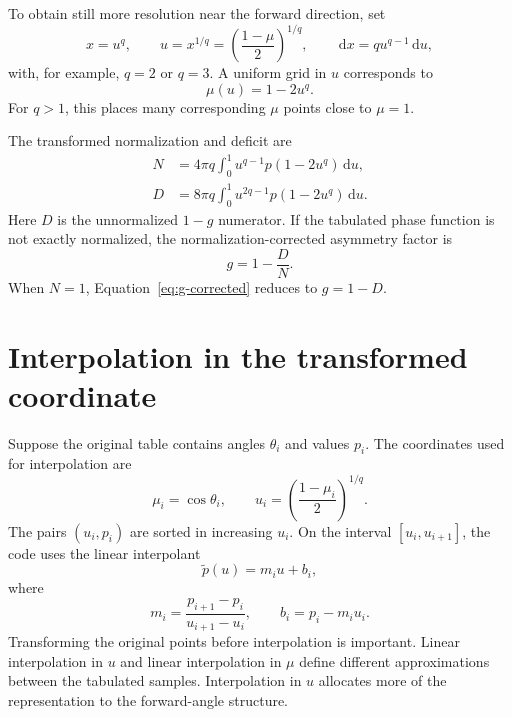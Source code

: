 \documentclass[11pt]{article}
\newcommand{\dd}{\,\mathrm{d}}
\begin{document}
To obtain still more resolution near the forward direction, set
\begin{equation}
    x=u^q,
    \qquad
    u=x^{1/q}
      =\left(\frac{1-\mu}{2}\right)^{1/q},
    \qquad
    \dd x=q u^{q-1}\dd u,
    \label{eq:u-transform}
\end{equation}
with, for example, $q=2$ or $q=3$.  A uniform grid in $u$ corresponds to
\begin{equation}
    \mu(u)=1-2u^q.
\end{equation}
For $q>1$, this places many corresponding $\mu$ points close to $\mu=1$.

The transformed normalization and deficit are
\begin{align}
    N
    &=4\pi q\int_0^1
      u^{q-1}p(1-2u^q)\dd u,
      \label{eq:N}\\
    D
    &=8\pi q\int_0^1
      u^{2q-1}p(1-2u^q)\dd u.
      \label{eq:D}
\end{align}
Here $D$ is the unnormalized $1-g$ numerator.  If the tabulated phase function
is not exactly normalized, the normalization-corrected asymmetry factor is
\begin{equation}
    \boxed{g=1-\frac{D}{N}}.
    \label{eq:g-corrected}
\end{equation}
When $N=1$, Equation~\eqref{eq:g-corrected} reduces to $g=1-D$.

\section{Interpolation in the transformed coordinate}

Suppose the original table contains angles $\theta_i$ and values $p_i$.  The
coordinates used for interpolation are
\begin{equation}
    \mu_i=\cos\theta_i,
    \qquad
    u_i=\left(\frac{1-\mu_i}{2}\right)^{1/q}.
\end{equation}
The pairs $(u_i,p_i)$ are sorted in increasing $u_i$.  On the interval
$[u_i,u_{i+1}]$, the code uses the linear interpolant
\begin{equation}
    \widetilde p(u)=m_i u+b_i,
    \label{eq:linear-interpolant}
\end{equation}
where
\begin{equation}
    m_i=\frac{p_{i+1}-p_i}{u_{i+1}-u_i},
    \qquad
    b_i=p_i-m_i u_i.
\end{equation}
Transforming the original points before interpolation is important.  Linear
interpolation in $u$ and linear interpolation in $\mu$ define different
approximations between the tabulated samples.  Interpolation in $u$ allocates
more of the representation to the forward-angle structure.
\end{document}
